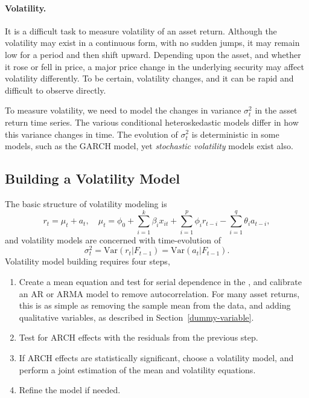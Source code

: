 \paragraph{Volatility.} It is a difficult task to measure volatility of an asset return. Although the volatility may exist in a continuous form, with no sudden jumps, it may remain low for a period and then shift upward. Depending upon the asset, and whether it rose or fell in price, a major price change in the underlying security may affect volatility differently. To be certain, volatility changes, and it can be rapid and difficult to observe directly.

To measure volatility, we need to model the changes in variance $\sigma^2_t$ in the asset return time series. The various conditional heteroskedastic models differ in how this variance changes in time. The evolution of $\sigma^2_t$ is deterministic in some models, such as the GARCH model, yet \emph{stochastic volatility} models exist also.

\subsection{Building a Volatility Model}
The basic structure of volatility modeling is
\[
r_t = \mu_t + a_t, \quad \mu_t = \phi_0 + \sum^k_{i=1}\beta_i x_{it} + \sum^p_{i=1}\phi_i r_{t-i}
- \sum^q_{i=1}\theta_i a_{t-i},
\]
and volatility models are concerned with time-evolution of
\[
\sigma^2_t = \text{Var} \left(r_t | F_{t-1} \right) = \text{Var} \left(a_t | F_{t-1} \right).
\]
Volatility model building requires four steps,
\begin{enumerate}
\item Create a mean equation and test for serial dependence in the \fts{}, and calibrate an AR or ARMA model to remove autocorrelation. For many asset returns, this is as simple as removing the sample mean from the data, and adding qualitative variables, as described in Section~\ref{dummy-variable}.
\item Test for ARCH effects with the residuals from the previous step.
\item If ARCH effects are statistically significant, choose a volatility model, and perform a joint estimation of the mean and volatility equations.
\item Refine the model if needed.
\end{enumerate}

